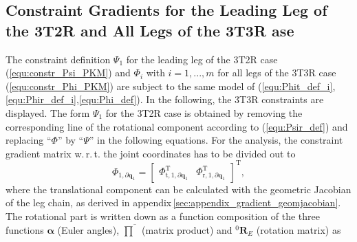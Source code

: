 \documentclass[robotics,article,accept,moreauthors,pdftex]{Definitions/mdpi}
\newcommand{\bm}[1]{\boldsymbol{#1}}
\newcommand{\rotmat}[2]{{{ }^{#1}\boldsymbol{R}}_{#2}}
\newcommand{\transp}[0]{{\mathrm{T}}}
\let\Phi\varPhi
\let\Psi\varPsi
\begin{document}
\subsection{Constraint Gradients for the Leading Leg of the 3T2R and All Legs of the 3T3R ase}
%
The constraint definition $\bm{\Psi}_1$ for the leading leg of the 3T2R case (\ref{equ:constr_Psi_PKM}) and $\bm{\Phi}_i$ with $i=1,...,m$ for all legs of the 3T3R case (\ref{equ:constr_Phi_PKM}) are subject to the same model of (\ref{equ:Phit_def_i},\ref{equ:Phir_def_i},\ref{equ:Phi_def}).
In the following, the 3T3R constraints are displayed.
The form $\bm{\Psi}_1$ for the 3T2R case is obtained by removing the corresponding line of the rotational component according to (\ref{equ:Psir_def}) and replacing ``$\bm{\Phi}$'' by ``$\bm{\Psi}$'' in the following equations.
For the analysis, the constraint gradient matrix w.\,r.\,t. the joint coordinates has to be divided out to
%
\begin{equation}
\bm{\Phi}_{1,\partial\bm{q}_1}
=
\begin{bmatrix}
\bm{\Phi}_{\mathrm{t},1,\partial\bm{q}_1}^\transp
&
\bm{\Phi}_{\mathrm{r},1,\partial\bm{q}_1}^\transp
\end{bmatrix}^\transp,
\label{equ:Phi_1_grad_q}
\end{equation}
%
where the translational component can be calculated with the geometric Jacobian of the leg chain, as derived in appendix\,\ref{sec:appendix_gradient_geomjacobian}. %
The rotational part is written down as a function composition of the three functions $\bm{\alpha}$ (Euler angles), $\overline{\prod}$ (matrix product) and $\rotmat{0}{E}$ (rotation matrix) as%

\end{document}
